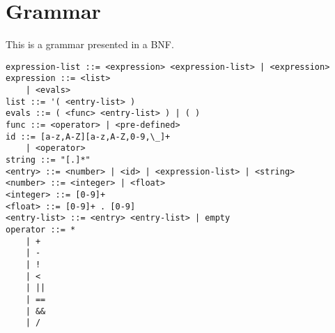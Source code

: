 \section{Grammar}

This is a grammar presented in a BNF. 


\begin{lstlisting}
expression-list ::= <expression> <expression-list> | <expression>
expression ::= <list> 
	| <evals>
list ::= '( <entry-list> )
evals ::= ( <func> <entry-list> ) | ( ) 
func ::= <operator> | <pre-defined>
id ::= [a-z,A-Z][a-z,A-Z,0-9,\_]+
	| <operator> 
string ::= "[.]*"
<entry> ::= <number> | <id> | <expression-list> | <string>
<number> ::= <integer> | <float> 
<integer> ::= [0-9]+
<float> ::= [0-9]+ . [0-9]
<entry-list> ::= <entry> <entry-list> | empty
operator ::= *
	| +
	| -
	| !
	| < 
	| ||
	| ==
	| &&
	| /
\end{lstlisting}

